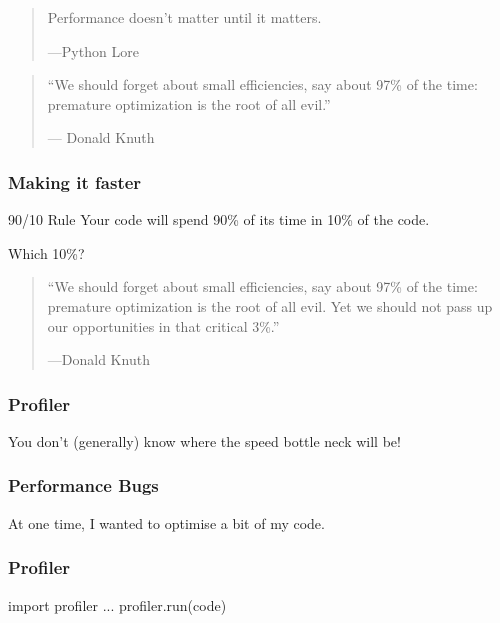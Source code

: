 \begin{frame}[fragile]

\begin{quote}
Performance doesn't matter until it matters.

---Python Lore
\end{quote}


\begin{frame}[fragile]

\begin{quote}
``We should forget about small efficiencies, say about 97\% of the time: premature optimization is the root of all evil.''

--- Donald Knuth
\end{quote}


\end{frame}

\end{frame}

\begin{frame}[fragile]
\frametitle{Making it faster}
\begin{block}{90/10 Rule}
Your code will spend 90\% of its time in 10\% of the code.
\end{block}

\pause
\bigskip
Which 10\%?
\end{frame}

\begin{frame}[fragile]

\begin{quote}
``We should forget about small efficiencies, say about 97\% of the time: premature optimization is the root of all evil. Yet we should not pass up our opportunities in that critical 3\%.''

---Donald Knuth
\end{quote}

\end{frame}

\begin{frame}[fragile]
\frametitle{Profiler}

You don't (generally) know where the speed bottle neck will be!
\end{frame}

\begin{frame}[fragile]
\frametitle{Performance Bugs}

At one time, I wanted to optimise a bit of my code.

\end{frame}

\begin{frame}[fragile]
\frametitle{Profiler}

\begin{python}
import profiler
...
profiler.run(code)
\end{python}
\end{frame}

